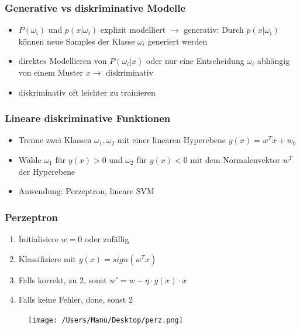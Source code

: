 \documentclass[paper=a4, fontsize=11pt]{scrartcl} %
\numberwithin{equation}{section} %
\numberwithin{figure}{section} %
\numberwithin{table}{section} %
\begin{document}
\subsubsection{Generative vs diskriminative Modelle}

\begin{itemize}
\item $P(\omega_i)$ und $p(x|\omega_i)$ explizit modelliert $\rightarrow$ generativ: Durch $p(x|\omega_i)$ können neue Samples der Klasse $\omega_i$ generiert werden
\item direktes Modellieren von $P(\omega_i|x)$ oder nur eine Entscheidung $\omega_i$ abhängig von einem Muster $x \rightarrow$ diskriminativ
\item diskriminativ oft leichter zu trainieren
\end{itemize}

\subsubsection{Lineare diskriminative Funktionen}

\begin{itemize}
\item Trenne zwei Klassen $\omega_1, \omega_2$ mit einer linearen Hyperebene $y(x) = w^T x + w_0$
\item Wähle $\omega_1$ für $y(x) > 0$ und $\omega_2$ für $y(x) < 0$ mit dem Normalenvektor $w^T$ der Hyperebene
\item Anwendung: Perzeptron, lineare SVM
\end{itemize}

\subsubsection{Perzeptron}

\begin{minipage}{0.55\textwidth}
\begin{enumerate}
\item Initialisiere $w = 0$ oder zufällig
\item Klassifiziere mit $y(x) = sign(w^Tx)$
\item Falls korrekt, zu 2, sonst $w' = w - \eta \cdot y(x) \cdot x$ 
\item Falls keine Fehler, done, sonst 2
\end{enumerate}
\end{minipage} \hfill
\begin{minipage}{0.4\textwidth}
\begin{figure}[H]
\texttt{[image: /Users/Manu/Desktop/perz.png]}
\end{figure}
\end{minipage}
\end{document}
